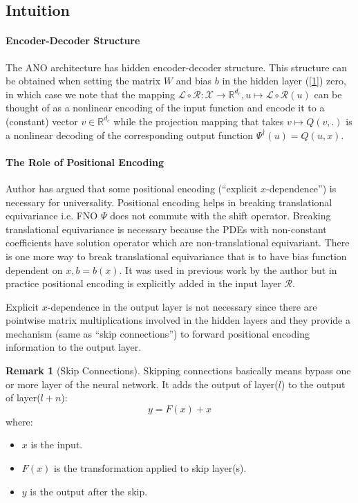 \documentclass[reqno,9pt]{amsart}
\theoremstyle{plain}
\theoremstyle{definition}
\newtheorem{rem}{Remark}
\newcommand{\bb}[1]{\mathbb{#1}}
\newcommand{\cal}[1]{\mathcal{#1}}
\begin{document}
\subsection{Intuition}
\paragraph{\bf Encoder-Decoder Structure} The ANO architecture has hidden encoder-decoder structure. This structure can be obtained when setting the matrix $W$ and bias $b$ in the hidden layer (\ref{1}) zero, in which case we note that the mapping $\cal L \circ \cal R : \cal X \to \bb R^{d_c}, u \mapsto \cal L \circ \cal R(u)$ can be thought of as a nonlinear encoding of the input function and encode it to a (constant) vector $v \in \bb R^{d_c}$ while the projection mapping that takes $v \mapsto Q(v,.)$ is a nonlinear decoding of the corresponding output function $\Psi^\dag(u) = Q(u,x)$.

\paragraph{\bf The Role of Positional Encoding}
Author has argued that some positional encoding (``explicit $x$-dependence'') is necessary for universality. Positional encoding helps in breaking translational equivariance i.e. FNO $\Psi$ does not commute with the shift operator. Breaking translational equivariance is necessary because the PDEs with non-constant coefficients have solution operator which are non-translational equivariant. There is one more way to break translational equivariance that is to have bias function dependent on $x, b = b(x)$. It was used in previous work by the author \cite{NK2021} but in practice positional encoding is explicitly added in the input layer $\cal R$.

\noindent Explicit $x$-dependence in the output layer is not necessary since there are pointwise matrix multiplications involved in the hidden layers and they provide a mechanism (same as ``skip connections'') to forward positional encoding information to the output layer.

\begin{rem}[Skip Connections]
    Skipping connections basically means bypass one or more layer of the neural network. It adds the output of layer($l$) to the output of layer($l+n$):
    $$ y = F(x) + x$$
    where:
    \begin{itemize}
        \item $x$ is the input.
        \item $F(x)$ is the transformation applied to skip layer(s).
        \item $y$ is the output after the skip.
    \end{itemize}
\end{rem}
\end{document}
